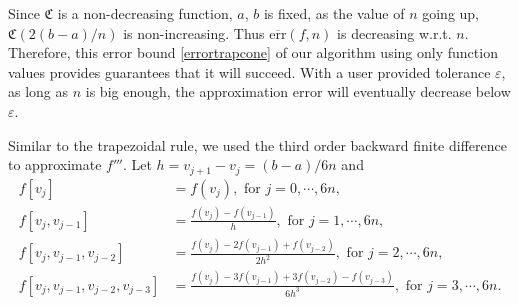 \documentclass{iitthesis}
\DeclareMathOperator{\Var}{Var}
\theoremstyle{definition}
\theoremstyle{remark}
\begin{document}
Since $\mathfrak{C}$ is a non-decreasing function, $a$, $b$ is fixed, as the value of $n$ going up, $\mathfrak{C}(2(b-a)/n)$ is non-increasing. Thus $\overline{\text{err}}(f,n)$ is decreasing w.r.t. $n$. Therefore, this error bound \eqref{errortrapcone} of our algorithm using only function values provides guarantees that it will succeed. With a user provided tolerance $\varepsilon$, as long as $n$ is big enough, the approximation error will eventually decrease below $\varepsilon$.


Similar to the trapezoidal rule, we used the third order backward finite difference to approximate $f'''$. Let $h=v_{j+1}-v_{j}=(b-a)/6n$ and
\begin{align*}
  f[v_{j}]&=f(v_{j}), \text{ for } j=0,\cdots, 6n,\\
  f[v_{j},v_{j-1}]&=\frac{f(v_{j})-f(v_{j-1})}{h},\text{ for } j=1, \cdots, 6n,\\
  f[v_{j},v_{j-1},v_{j-2}]&=\frac{f(v_{j})-2f(v_{j-1})+f(v_{j-2})}{2h^2},\text{ for } j=2, \cdots, 6n,\\
  f[v_{j},v_{j-1},v_{j-2},v_{j-3}]&=\frac{f(v_{j})-3f(v_{j-1})+3f(v_{j-2})-f(v_{j-3})}{6h^3}, \text{ for } j=3, \cdots, 6n.
\end{align*}



\end{document}
